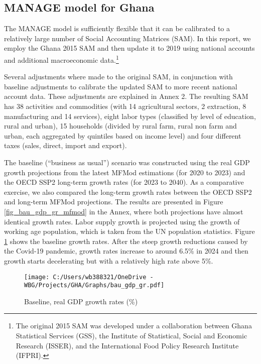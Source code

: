 \documentclass[11pt,english]{article}
\begin{document}
\subsection{MANAGE model for Ghana}

The MANAGE model is sufficiently flexible that it can be calibrated to a relatively large number of Social Accounting Matrices (SAM). In this report, we employ the Ghana 2015 SAM and then update it to 2019 using national accounts and additional macroeconomic data.\footnote{The original 2015 SAM was developed under a collaboration between Ghana Statistical Services (GSS), the Institute of Statistical, Social and Economic Research (ISSER), and the International Food Policy Research Institute (IFPRI).} 

Several adjustments where made to the original SAM, in conjunction with baseline adjustments to calibrate the updated SAM to more recent national account data. These adjustments are explained in Annex 2. The resulting SAM has 38 activities and commodities (with 14 agricultural sectors, 2 extraction, 8 manufacturing and 14 services), eight labor types (classified by level of education, rural and urban), 15 households (divided by rural farm, rural non farm and urban, each aggregated by quintiles based on income level) and four different taxes (sales, direct, import and export).  


The baseline (``business as usual'') scenario was constructed using the real GDP growth projections from the latest MFMod estimations (for 2020 to 2023) and the OECD SSP2 long-term growth rates (for 2023 to 2040). As a comparative exercise, we also compared the long-term growth rates between the OECD SSP2 and long-term MFMod projections. The results are presented in Figure \ref{fig_bau_gdp_gr_mfmod} in the Annex, where both projections have almost identical growth rates. Labor supply growth is projected using the growth of working age population, which is taken from the UN population statistics. Figure \ref{fig_bau_gdp_gr} shows the baseline growth rates. After the steep growth reductions caused by the Covid-19 pandemic, growth rates increase to around 6.5\% in 2024 and then growth starts decelerating but with a relatively high rate  above 5\%.

\begin{figure}[ht!]\caption{Baseline, real GDP growth rates (\%)} \label{fig_bau_gdp_gr}
	\centering
	\texttt{[image: C:/Users/wb388321/OneDrive - WBG/Projects/GHA/Graphs/bau\_gdp\_gr.pdf]}
\end{figure}
\end{document}
